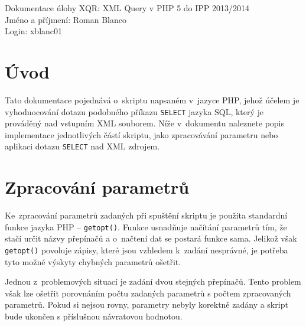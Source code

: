 \documentclass[10pt,a4paper,final]{article}
\begin{document}

  \pagestyle{plain}
  \setcounter{page}{1}
  
  \setlength{\parindent}{1cm}
  \setlength{\parskip}{0.5cm plus4mm minus3mm}
  
  \noindent
  Dokumentace úlohy XQR: XML Query v PHP 5 do IPP 2013/2014 \\
  Jméno a příjmení: Roman Blanco \\
  Login: xblanc01 \\
  


  \section{Úvod} \label{uvod}

    Tato dokumentace pojednává o~skriptu napsaném v~jazyce PHP, jehož účelem je
    vyhodnocování dotazu podobného příkazu \texttt{SELECT} jazyka SQL, který je 
    prováděný nad vstupním XML souborem. Níže v~dokumentu naleznete popis
    implementace jednotlivých částí skriptu, jako zpracovávání parametru nebo
    aplikaci dotazu \texttt{SELECT} nad XML zdrojem.

  \section{Zpracování parametrů} \label{zpracovani-parametru}

    Ke~zpracování parametrů zadaných při spuštění skriptu je použita standardní
    funkce jazyka PHP -- \texttt{getopt()}. Funkce usnadňuje načítání
    parametrů tím, že stačí určit názvy přepínačů a o~načtení dat se postará
    funkce sama. Jelikož však \texttt{getopt()} povoluje zápisy, které 
    jsou vzhledem k~zadání nesprávné, je potřeba tyto možné výskyty chybných
    parametrů ošetřit.
    
    Jednou z~problemových situací je zadání dvou stejných přepínačů. Tento
    problem však lze ošetřit porovnáním počtu zadaných parametrů
    s počtem zpracovaných parametrů. Pokud si nejsou rovny, parametry nebyly
    korektně zadány a skript bude ukončen s příslušnou návratovou hodnotou.
    
\end{document}

